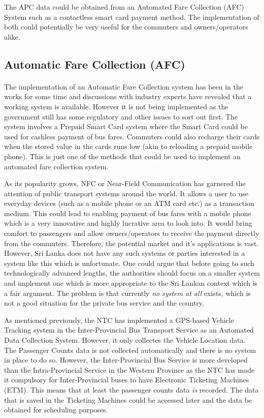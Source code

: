 \documentclass[12pt, oneside]{report}
\begin{document}
The APC data could be obtained from an Automated Fare Collection (AFC) System such as a contactless smart card payment method. The implementation of both could potentially be very useful for the commuters and owners/operators alike.

\subsection{Automatic Fare Collection (AFC)}

\paragraph{ } The implementation of an Automatic Fare Collection system has been in the works for some time and discussions with industry experts have revealed that a working system is available. However it is not being implemented as the government still has some regulatory and other issues to sort out first. The system involves a Prepaid Smart Card system where the Smart Card could be used for cashless payment of bus fares. Commuters could also recharge their cards when the stored value in the cards runs low (akin to reloading a prepaid mobile phone). This is just one of the methods that could be used to implement an automated fare collection system.

As its popularity grows, NFC or Near-Field Communication has garnered the attention of public transport systems around the world. It allows a user to use everyday devices (such as a mobile phone or an ATM card etc.) as a transaction medium. This could lead to enabling payment of bus fares with a mobile phone which is a very innovative and highly lucrative area to look into. It would bring comfort to passengers and allow owners/operators to receive the payment directly from the commuters. Therefore, the potential market and it's applications is vast. However, Sri Lanka does not have any such systems or parties interested in a system like this which is unfortunate. One could argue that before going to such technologically advanced lengths, the authorities should focus on a smaller system and implement one which is more appropriate to the Sri Lankan context which is a fair argument. The problem is that currently \textit{no system at all} exists, which is not a good situation for the private bus service and the country.

As mentioned previously, the NTC has implemented a GPS-based Vehicle Tracking system in the Inter-Provincial Bus Transport Service as an Automated Data Collection System. However, it only collectes the Vehicle Location data. The Passenger Counts data is not collected automatically and there is no system in place to do so. However, the Inter-Provincial Bus Service is more developed than the Intra-Provincial Service in the Western Province as the NTC has made it compulsory for Inter-Provincial buses to have Electronic Ticketing Machines (ETM). This means that at least the passenger counts data \textit{is} recorded. The data that is saved in the Ticketing Machines could be accessed later and the data be obtained for scheduling purposes.
\end{document}
